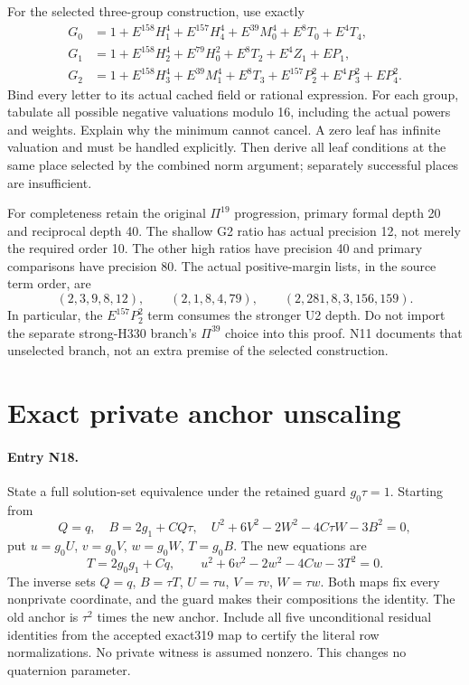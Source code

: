 \documentclass{article}
\begin{document}
For the selected three-group construction, use exactly
\begin{align*}
 G_0&=1+E^{158}H_1^4+E^{157}H_4^4+E^{39}M_0^4+E^8T_0+E^4T_4,\\
 G_1&=1+E^{158}H_2^4+E^{79}H_0^2+E^8T_2+E^4Z_1+EP_1,\\
 G_2&=1+E^{158}H_3^4+E^{39}M_1^4+E^8T_3+E^{157}P_2^2+E^4P_3^2+EP_4^2.
\end{align*}
Bind every letter to its actual cached field or rational expression.
For each group, tabulate all possible negative valuations modulo 16,
including the actual powers and weights. Explain why the minimum cannot
cancel. A zero leaf has infinite valuation and must be handled explicitly.
Then derive all leaf conditions at the same place selected by the
combined norm argument; separately successful places are insufficient.

For completeness retain the original $\Pi^{19}$ progression, primary
formal depth 20 and reciprocal depth 40. The shallow G2 ratio has actual
precision 12, not merely the required order 10. The other high ratios
have precision 40 and primary comparisons have precision 80.
The actual positive-margin lists, in the source term order, are
\[
 (2,3,9,8,12),\qquad (2,1,8,4,79),\qquad
 (2,281,8,3,156,159).
\]
In particular, the $E^{157}P_2^2$ term consumes the stronger U2 depth.
Do not import the separate strong-H330 branch's $\Pi^{39}$ choice into
this proof. N11 documents that unselected branch, not an extra premise
of the selected construction.

\section{Exact private anchor unscaling}
\label{outline:unscale}
\paragraph{Entry N18.}
State a full solution-set equivalence under the retained guard
$g_0\tau=1$. Starting from
\[
 Q=q,\quad B=2g_1+CQ\tau,\quad
 U^2+6V^2-2W^2-4C\tau W-3B^2=0,
\]
put $u=g_0U$, $v=g_0V$, $w=g_0W$, $T=g_0B$. The new equations are
\[
 T=2g_0g_1+Cq,\qquad u^2+6v^2-2w^2-4Cw-3T^2=0.
\]
The inverse sets $Q=q$, $B=\tau T$, $U=\tau u$, $V=\tau v$,
$W=\tau w$. Both maps fix every nonprivate coordinate, and the guard
makes their compositions the identity. The old anchor is $\tau^2$
times the new anchor. Include all five unconditional residual identities
from the accepted exact319 map to certify the literal row normalizations.
No private witness is assumed nonzero. This changes no quaternion parameter.
\end{document}
